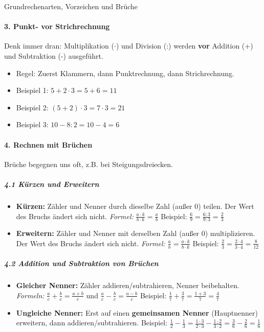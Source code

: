 \begin{erinnerungsboxumgebung}{Grundrechenarten, Vorzeichen und Brüche}
\paragraph{3. Punkt- vor Strichrechnung}
Denk immer dran: Multiplikation ($\cdot$) und Division (:) werden \textbf{vor} Addition (+) und Subtraktion (-) ausgeführt.
\begin{itemize}
    \item Regel: Zuerst Klammern, dann Punktrechnung, dann Strichrechnung.
    \item Beispiel 1: $5 + 2 \cdot 3 = 5 + 6 = 11$
    \item Beispiel 2: $(5+2) \cdot 3 = 7 \cdot 3 = 21$
    \item Beispiel 3: $10 - 8 : 2 = 10 - 4 = 6$
\end{itemize}

\paragraph{4. Rechnen mit Brüchen}
Brüche begegnen uns oft, z.B. bei Steigungsdreiecken.
\subparagraph{4.1 Kürzen und Erweitern}
\begin{itemize}
    \item \textbf{Kürzen:} Zähler und Nenner durch dieselbe Zahl (außer 0) teilen. Der Wert des Bruchs ändert sich nicht.
    \textit{Formel:} $\frac{a \cdot k}{b \cdot k} = \frac{a}{b}$
    Beispiel: $\frac{6}{9} = \frac{6:3}{9:3} = \frac{2}{3}$
    \item \textbf{Erweitern:} Zähler und Nenner mit derselben Zahl (außer 0) multiplizieren. Der Wert des Bruchs ändert sich nicht.
    \textit{Formel:} $\frac{a}{b} = \frac{a \cdot k}{b \cdot k}$
    Beispiel: $\frac{2}{3} = \frac{2 \cdot 4}{3 \cdot 4} = \frac{8}{12}$
\end{itemize}

\subparagraph{4.2 Addition und Subtraktion von Brüchen}
\begin{itemize}
    \item \textbf{Gleicher Nenner:} Zähler addieren/subtrahieren, Nenner beibehalten.
    \textit{Formeln:} $\frac{a}{c} + \frac{b}{c} = \frac{a+b}{c}$ \quad und \quad $\frac{a}{c} - \frac{b}{c} = \frac{a-b}{c}$
    Beispiel: $\frac{1}{7} + \frac{3}{7} = \frac{1+3}{7} = \frac{4}{7}$
    \item \textbf{Ungleiche Nenner:} Erst auf einen \textbf{gemeinsamen Nenner} (Hauptnenner) erweitern, dann addieren/subtrahieren.
    Beispiel: $\frac{1}{2} - \frac{1}{3} = \frac{1 \cdot 3}{2 \cdot 3} - \frac{1 \cdot 2}{3 \cdot 2} = \frac{3}{6} - \frac{2}{6} = \frac{1}{6}$
\end{itemize}


\end{erinnerungsboxumgebung}
